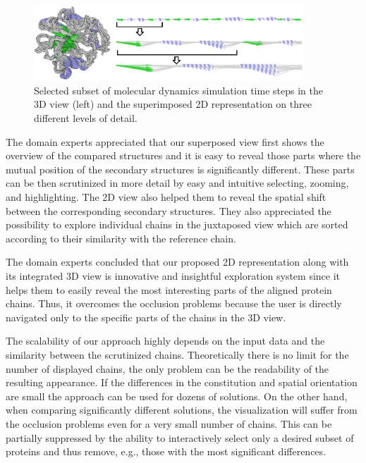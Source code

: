 \documentclass[twocolumn]{bmcart}%
\begin{document}
\begin{figure}[hbt]
  \centering
  \includegraphics[width=0.9\textwidth]{pics/case2.png}
  \caption{Selected subset of molecular dynamics simulation time steps in the 3D view (left) and the superimposed 2D representation on three different levels of detail.}
  \label{fig:case2}
\end{figure}

The domain experts appreciated that our superposed view first shows the overview of the compared structures and it is easy to reveal those parts where the mutual position of the secondary structures is significantly different.
These parts can be then scrutinized in more detail by easy and intuitive selecting, zooming, and highlighting.
The 2D view also helped them to reveal the spatial shift between the corresponding secondary structures.
They also appreciated the possibility to explore individual chains in the juxtaposed view which are sorted according to their similarity with the reference chain.

The domain experts concluded that our proposed 2D representation along with its integrated 3D view is innovative and insightful exploration system since it helps them to easily reveal the most interesting parts of the aligned protein chains.
Thus, it overcomes the occlusion problems because the user is directly navigated only to the specific parts of the chains in the 3D view.

The scalability of our approach highly depends on the input data and the similarity between the scrutinized chains.
Theoretically there is no limit for the number of displayed chains, the only problem can be the readability of the resulting appearance.
If the differences in the constitution and spatial orientation are small the approach can be used for dozens of solutions.
On the other hand, when comparing significantly different solutions, the visualization will suffer from the occlusion problems even for a very small number of chains.
This can be partially suppressed by the ability to interactively select only a desired subset of proteins and thus remove, e.g., those with the most significant differences.
\end{document}
